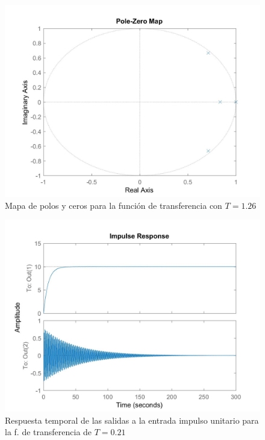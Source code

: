 \documentclass[journal]{IEEEtran}
\begin{document}
\begin{figure}[h!]
\caption{Mapa de polos y ceros para la función de transferencia con $T=1.26$\label{fig:pzGd2}}
  \centering
\includegraphics[scale=0.18]{tf/pzmap_Gd_2.jpg}
\end{figure}

\begin{figure}[h!]
\caption{Respuesta temporal de las salidas a la entrada impulso unitario para la f. de transferencia de $T=0.21$\label{fig:impulseGd}}
  \centering
\includegraphics[scale=0.18]{tf/impulse_Gd.jpg}
\end{figure}
\end{document}
